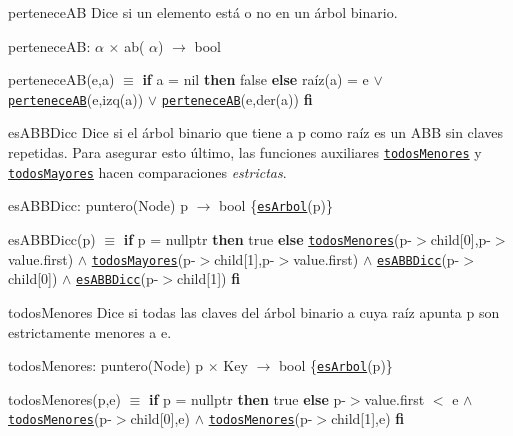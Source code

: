 \begin{DoxyParagraph}{pertenece\-A\-B}
Dice si un elemento está o no en un árbol binario.

pertenece\-A\-B\-:  $\alpha$ $\times$ ab( $\alpha$) $\to$ bool \par
 pertenece\-A\-B(e,a) $\equiv$ {\bfseries if} a = nil {\bfseries then} false {\bfseries else} raíz(a) = e $\lor$ \href{axiomas.html#perteneceAB}{\tt pertenece\-A\-B}(e,izq(a)) $\lor$ \href{axiomas.html#perteneceAB}{\tt pertenece\-A\-B}(e,der(a)) {\bfseries fi} 


\end{DoxyParagraph}
\begin{DoxyParagraph}{es\-A\-B\-B\-Dicc}
Dice si el árbol binario que tiene a p como raíz es un A\-B\-B sin claves repetidas. Para asegurar esto último, las funciones auxiliares \href{axiomas.html#todosMenores}{\tt todos\-Menores} y \href{axiomas.html#todosMayores}{\tt todos\-Mayores} hacen comparaciones {\itshape estrictas}.

es\-A\-B\-B\-Dicc\-: puntero(\-Node) p $\to$ bool \{\href{axiomas.html#esArbol}{\tt es\-Arbol}(p)\} \par
 es\-A\-B\-B\-Dicc(p) $\equiv$ {\bfseries if} p = nullptr {\bfseries then} true {\bfseries else} \href{axiomas.html#todosMenores}{\tt todos\-Menores}(p-\/$>$child\mbox{[}0\mbox{]},p-\/$>$value.\-first) $\land$ \href{axiomas.html#todosMayores}{\tt todos\-Mayores}(p-\/$>$child\mbox{[}1\mbox{]},p-\/$>$value.\-first) $\land$ \href{axiomas.html#esABBDicc}{\tt es\-A\-B\-B\-Dicc}(p-\/$>$child\mbox{[}0\mbox{]}) $\land$ \href{axiomas.html#esABBDicc}{\tt es\-A\-B\-B\-Dicc}(p-\/$>$child\mbox{[}1\mbox{]}) {\bfseries fi} 


\end{DoxyParagraph}
\begin{DoxyParagraph}{todos\-Menores}
Dice si todas las claves del árbol binario a cuya raíz apunta p son estrictamente menores a e.

todos\-Menores\-: puntero(\-Node) p $\times$ Key $\to$ bool \{\href{axiomas.html#esArbol}{\tt es\-Arbol}(p)\} \par
 todos\-Menores(p,e) $\equiv$ {\bfseries if} p = nullptr {\bfseries then} true {\bfseries else} p-\/$>$value.\-first $<$ e $\land$ \href{axiomas.html#todosMenores}{\tt todos\-Menores}(p-\/$>$child\mbox{[}0\mbox{]},e) $\land$ \href{axiomas.html#todosMenores}{\tt todos\-Menores}(p-\/$>$child\mbox{[}1\mbox{]},e) {\bfseries fi} 


\end{DoxyParagraph}
